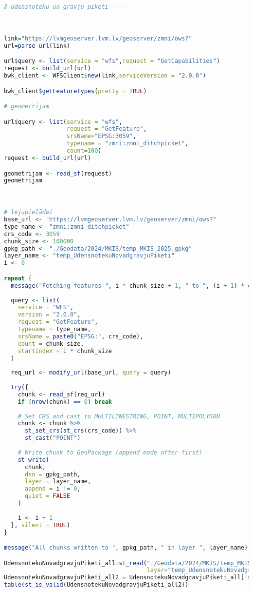 \documentclass[
]{book}
\begin{document}
\begin{lstlisting}[language=R]
# ūdensnoteku un grāvju piketi ----



link="https://lvmgeoserver.lvm.lv/geoserver/zmni/ows?"
url=parse_url(link)

url$query <- list(service = "wfs",request = "GetCapabilities")
request <- build_url(url)
bwk_client <- WFSClient$new(link,serviceVersion = "2.0.0")

bwk_client$getFeatureTypes(pretty = TRUE)

# geometrijam

url$query <- list(service = "wfs",
                  request = "GetFeature",
                  srsName="EPSG:3059",
                  typename = "zmni:zmni_ditchpicket",
                  count=100)
request <- build_url(url)

geometrijam <- read_sf(request)
geometrijam



# lejupielādei
base_url <- "https://lvmgeoserver.lvm.lv/geoserver/zmni/ows?"
type_name <- "zmni:zmni_ditchpicket"
crs_code <- 3059
chunk_size <- 100000
gpkg_path <- "./Geodata/2024/MKIS/temp_MKIS_2025.gpkg"
layer_name <- "temp_UdensnotekuNovadgravjuPiketi"
i <- 0

repeat {
  message("Fetching features ", i * chunk_size + 1, " to ", (i + 1) * chunk_size, "...")
  
  query <- list(
    service = "WFS",
    version = "2.0.0",
    request = "GetFeature",
    typename = type_name,
    srsName = paste0("EPSG:", crs_code),
    count = chunk_size,
    startIndex = i * chunk_size
  )
  
  req_url <- modify_url(base_url, query = query)
  
  try({
    chunk <- read_sf(req_url)
    if (nrow(chunk) == 0) break
    
    # Set CRS and cast to MULTILINESTRING, POINT, MULTIPOLYGON
    chunk <- chunk %>%
      st_set_crs(st_crs(crs_code)) %>%
      st_cast("POINT")
    
    # Write chunk to GeoPackage (append mode after first)
    st_write(
      chunk, 
      dsn = gpkg_path,
      layer = layer_name,
      append = i != 0,
      quiet = FALSE
    )
    
    i <- i + 1
  }, silent = TRUE)
}

message("All chunks written to ", gpkg_path, " in layer ", layer_name)

UdensnotekuNovadgravjuPiketi_all=st_read("./Geodata/2024/MKIS/temp_MKIS_2025.gpkg",
                                         layer="temp_UdensnotekuNovadgravjuPiketi")
UdensnotekuNovadgravjuPiketi_all2 = UdensnotekuNovadgravjuPiketi_all[!st_is_empty(UdensnotekuNovadgravjuPiketi_all),,drop=FALSE] # 0
table(st_is_valid(UdensnotekuNovadgravjuPiketi_all2))



\end{lstlisting}
\end{document}
